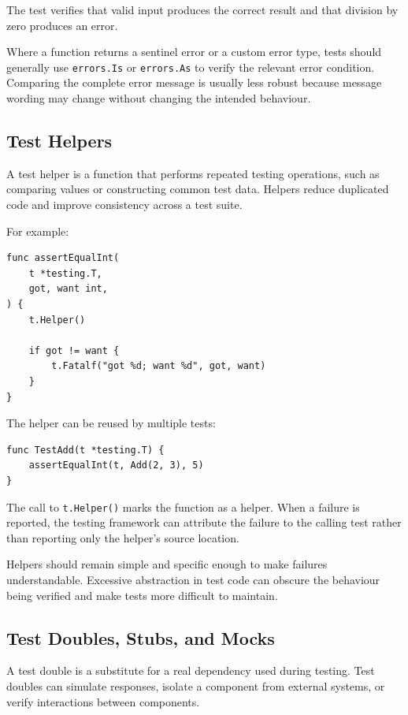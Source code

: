 The test verifies that valid input produces the correct result and that division by zero produces an error.

Where a function returns a sentinel error or a custom error type, tests should generally use \texttt{errors.Is} or \texttt{errors.As} to verify the relevant error condition. Comparing the complete error message is usually less robust because message wording may change without changing the intended behaviour.

\subsection{Test Helpers}

A test helper is a function that performs repeated testing operations, such as comparing values or constructing common test data. Helpers reduce duplicated code and improve consistency across a test suite.

For example:

\begin{lstlisting}
func assertEqualInt(
    t *testing.T,
    got, want int,
) {
    t.Helper()

    if got != want {
        t.Fatalf("got %d; want %d", got, want)
    }
}
\end{lstlisting}

The helper can be reused by multiple tests:

\begin{lstlisting}
func TestAdd(t *testing.T) {
    assertEqualInt(t, Add(2, 3), 5)
}
\end{lstlisting}

The call to \texttt{t.Helper()} marks the function as a helper. When a failure is reported, the testing framework can attribute the failure to the calling test rather than reporting only the helper's source location.

Helpers should remain simple and specific enough to make failures understandable. Excessive abstraction in test code can obscure the behaviour being verified and make tests more difficult to maintain.

\subsection{Test Doubles, Stubs, and Mocks}

A test double is a substitute for a real dependency used during testing. Test doubles can simulate responses, isolate a component from external systems, or verify interactions between components.

